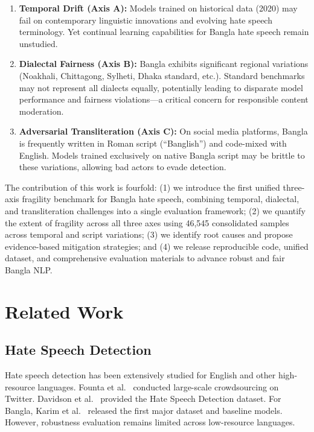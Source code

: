\documentclass[conference]{IEEEtran}
\begin{document}
\begin{enumerate}
\item \textbf{Temporal Drift (Axis A):} Models trained on historical data (2020) may fail on contemporary linguistic innovations and evolving hate speech terminology. Yet continual learning capabilities for Bangla hate speech remain unstudied.

\item \textbf{Dialectal Fairness (Axis B):} Bangla exhibits significant regional variations (Noakhali, Chittagong, Sylheti, Dhaka standard, etc.). Standard benchmarks may not represent all dialects equally, potentially leading to disparate model performance and fairness violations---a critical concern for responsible content moderation.

\item \textbf{Adversarial Transliteration (Axis C):} On social media platforms, Bangla is frequently written in Roman script (``Banglish'') and code-mixed with English. Models trained exclusively on native Bangla script may be brittle to these variations, allowing bad actors to evade detection.
\end{enumerate}

The contribution of this work is fourfold: (1) we introduce the first unified three-axis fragility benchmark for Bangla hate speech, combining temporal, dialectal, and transliteration challenges into a single evaluation framework; (2) we quantify the extent of fragility across all three axes using 46,545 consolidated samples across temporal and script variations; (3) we identify root causes and propose evidence-based mitigation strategies; and (4) we release reproducible code, unified dataset, and comprehensive evaluation materials to advance robust and fair Bangla NLP.

\section{Related Work}

\subsection{Hate Speech Detection}

Hate speech detection has been extensively studied for English and other high-resource languages. Founta et al.~\cite{founta2018large} conducted large-scale crowdsourcing on Twitter. Davidson et al.~\cite{davidson2017hate} provided the Hate Speech Detection dataset. For Bangla, Karim et al.~\cite{karim2020} released the first major dataset and baseline models. However, robustness evaluation remains limited across low-resource languages.
\end{document}
